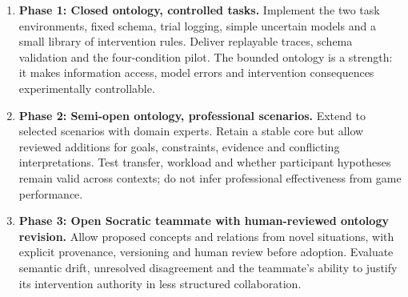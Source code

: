 \documentclass[11pt,a4paper]{article}
\begin{document}
\begin{enumerate}
\item \textbf{Phase 1: Closed ontology, controlled tasks.} Implement the two task environments, fixed schema, trial logging, simple uncertain models and a small library of intervention rules. Deliver replayable traces, schema validation and the four-condition pilot. The bounded ontology is a strength: it makes information access, model errors and intervention consequences experimentally controllable.
\item \textbf{Phase 2: Semi-open ontology, professional scenarios.} Extend to selected scenarios with domain experts. Retain a stable core but allow reviewed additions for goals, constraints, evidence and conflicting interpretations. Test transfer, workload and whether participant hypotheses remain valid across contexts; do not infer professional effectiveness from game performance.
\item \textbf{Phase 3: Open Socratic teammate with human-reviewed ontology revision.} Allow proposed concepts and relations from novel situations, with explicit provenance, versioning and human review before adoption. Evaluate semantic drift, unresolved disagreement and the teammate's ability to justify its intervention authority in less structured collaboration.
\end{enumerate}
\end{document}
